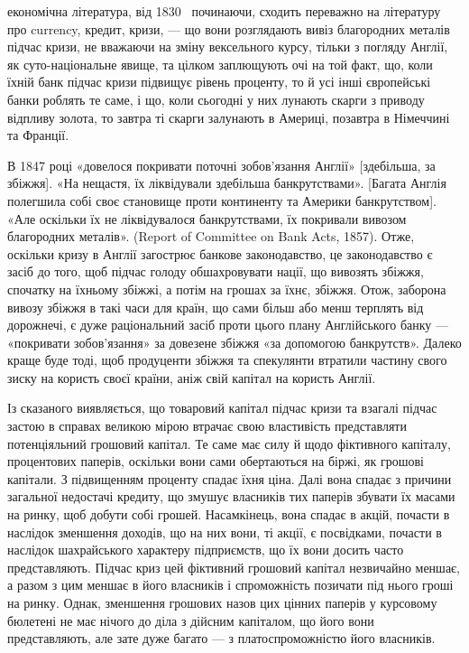 \parcont{}  %
економічна література, від 1830~ починаючи, сходить переважно на літературу
про currency, кредит, кризи, — що вони розглядають вивіз благородних металів підчас
кризи, не вважаючи на зміну вексельного курсу, тільки з погляду Англії, як
суто-національне явище, та цілком заплющують очі на той факт, що, коли їхній
банк підчас кризи підвищує рівень проценту, то й усі інші європейські банки
роблять те саме, і що, коли сьогодні у них лунають скарги з приводу відпливу
золота, то завтра ті скарги залунають в Америці, позавтра в Німеччині та Франції.

В 1847 році «довелося покривати поточні зобов’язання Англії» [здебільша, за
збіжжя]. «На нещастя, їх ліквідували здебільша банкрутствами». [Багата Англія
полегшила собі своє становище проти континенту та Америки банкрутством]. «Але
оскільки їх не ліквідувалося банкрутствами, їх покривали вивозом благородних
металів». (Report of Committee on Bank Acts, 1857). Отже, оскільки кризу в Англії
загострює банкове законодавство, це законодавство є засіб до того, щоб підчас
голоду обшахровувати нації, що вивозять збіжжя, спочатку на їхньому збіжжі,
а потім на грошах за їхнє, збіжжя. Отож, заборона вивозу збіжжя в такі часи
для країн, що сами більш або менш терплять від дорожнечі, є дуже раціональний
засіб проти цього плану Англійського банку — «покривати зобов’язання» за
довезене збіжжя «за допомогою банкрутств». Далеко краще буде тоді, щоб продуценти
збіжжя та спекулянти втратили частину свого зиску на користь своєї
країни, аніж свій капітал на користь Англії.

Із сказаного виявляється, що товаровий капітал підчас кризи та взагалі
підчас застою в справах великою мірою втрачає свою властивість представляти
потенціяльний грошовий капітал. Те саме має силу й щодо фіктивного
капіталу, процентових паперів, оскільки вони сами обертаються на біржі, як
грошові капітали. З підвищенням проценту спадає їхня ціна. Далі вона спадає
з причини загальної недостачі кредиту, що змушує власників тих паперів збувати
їх масами на ринку, щоб добути собі грошей. Насамкінець, вона спадає
в акцій, почасти в наслідок зменшення доходів, що на них вони, ті акції, є
посвідками, почасти в наслідок шахрайського характеру підприємств, що їх вони
досить часто представляють. Підчас криз цей фіктивний грошовий капітал незвичайно
меншає, а разом з цим меншає в його власників і спроможність позичати
під нього гроші на ринку. Однак, зменшення грошових назов цих цінних
паперів у курсовому бюлетені не має нічого до діла з дійсним капіталом, що
його вони представляють, але зате дуже багато — з платоспроможністю його
власників.

